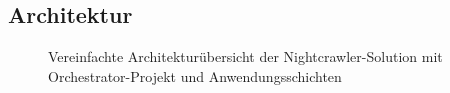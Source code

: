 \subsection{Architektur}
\label{app:Architektur}
\begin{figure}[htb]
\centering
{}
\caption{Vereinfachte Architekturübersicht der Nightcrawler-Solution mit Orchestrator-Projekt und Anwendungsschichten}
\label{fig:ArchitekturNightcrawler}
\end{figure}